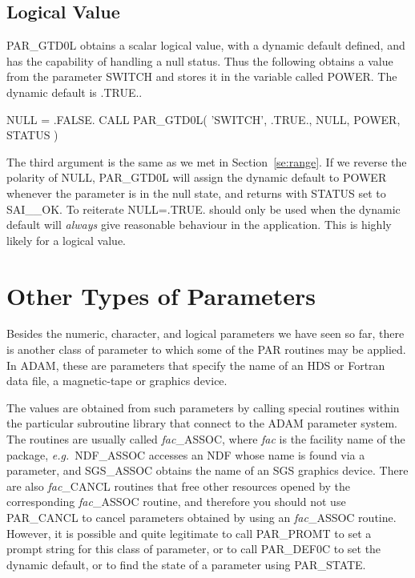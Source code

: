\documentclass[twoside,11pt,nolof]{starlink}
\begin{document}
\subsection{Logical Value}

PAR\_GTD0L obtains a scalar logical value, with a dynamic default
defined, and has the capability of handling a null status.  Thus the
following obtains a value from the parameter SWITCH and stores it in the
variable called POWER.  The dynamic default is .TRUE..

\begin{terminalv}
      NULL = .FALSE.
      CALL PAR_GTD0L( 'SWITCH', .TRUE., NULL, POWER, STATUS )
\end{terminalv}

The third argument is the same as we met in Section~\ref{se:range}. If
we reverse the polarity of NULL, PAR\_GTD0L will assign the dynamic
default to POWER whenever the parameter is in the null state, and
returns with STATUS set to SAI\_\_OK.  To reiterate NULL=.TRUE. should
only be used when the dynamic default will \emph{always\/} give
reasonable behaviour in the application.  This is highly likely for a
logical value.

\section{Other Types of Parameters}

Besides the numeric, character, and logical parameters we have seen so
far, there is another class of parameter to which some of the PAR
routines may be applied.  In {\footnotesize ADAM}, these are parameters
that specify the name of an HDS or Fortran data file, a magnetic-tape or
graphics device.

The values are obtained from such parameters by calling special routines
within the particular subroutine library that connect to the
{\footnotesize ADAM} parameter system.  The routines are usually called
\textit{fac}\_ASSOC, where \textit{fac\/} is the facility name of the package,
\textit{e.g.}\ NDF\_ASSOC accesses an NDF whose name is found via a
parameter, and SGS\_ASSOC obtains the name of an SGS graphics device.
There are also \textit{fac}\_CANCL routines that free other resources
opened by the corresponding \textit{fac}\_ASSOC routine, and therefore you
should not use PAR\_CANCL to cancel parameters obtained by using an \textit{fac}\_ASSOC routine. However, it is possible and quite legitimate to
call PAR\_PROMT to set a prompt string for this class of parameter, or
to call PAR\_DEF0C to set the dynamic default, or to find the state of a
parameter using PAR\_STATE.
\end{document}
